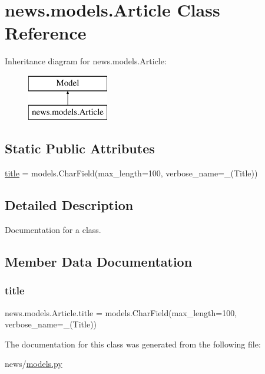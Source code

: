 \hypertarget{classnews_1_1models_1_1_article}{}\section{news.\+models.\+Article Class Reference}
\label{classnews_1_1models_1_1_article}
Inheritance diagram for news.\+models.\+Article\+:\begin{figure}[H]
\begin{center}
\leavevmode
\includegraphics[height=2.000000cm]{classnews_1_1models_1_1_article}
\end{center}
\end{figure}
\subsection*{Static Public Attributes}
\begin{DoxyCompactItemize}
\item 
\mbox{\hyperlink{classnews_1_1models_1_1_article_a842d0d512e3991f1a5311205efe4fae9}{title}} = models.\+Char\+Field(max\+\_\+length=100, verbose\+\_\+name=\+\_\+(\textquotesingle{}Title\textquotesingle{}))
\end{DoxyCompactItemize}


\subsection{Detailed Description}
\begin{DoxyVerb}Documentation for a class.
\end{DoxyVerb}
 

\subsection{Member Data Documentation}
\mbox{\label{classnews_1_1models_1_1_article_a842d0d512e3991f1a5311205efe4fae9}} 
\subsubsection{\texorpdfstring{title}{title}}
{\footnotesize\ttfamily news.\+models.\+Article.\+title = models.\+Char\+Field(max\+\_\+length=100, verbose\+\_\+name=\+\_\+(\textquotesingle{}Title\textquotesingle{}))\hspace{0.3cm}{\ttfamily [static]}}



The documentation for this class was generated from the following file\+:\begin{DoxyCompactItemize}
\item 
news/\mbox{\hyperlink{models_8py}{models.\+py}}\end{DoxyCompactItemize}
